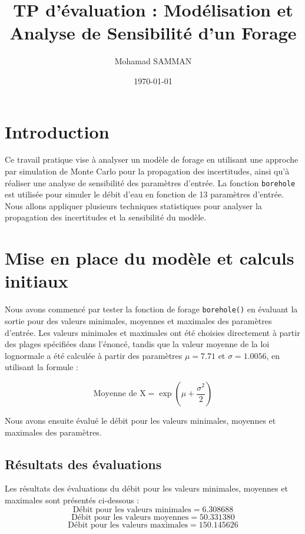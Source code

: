 \documentclass[a4paper,12pt]{article}
\title{TP d'évaluation : Modélisation et Analyse de Sensibilité d'un Forage}
\author{Mohamad SAMMAN}
\date{\today}
\begin{document}
\maketitle
\tableofcontents
\newpage
\section{Introduction}
Ce travail pratique vise à analyser un modèle de forage en utilisant une approche par simulation de Monte Carlo pour la propagation des incertitudes, ainsi qu'à réaliser une analyse de sensibilité des paramètres d'entrée. La fonction \texttt{borehole} est utilisée pour simuler le débit d'eau en fonction de 13 paramètres d'entrée. Nous allons appliquer plusieurs techniques statistiques pour analyser la propagation des incertitudes et la sensibilité du modèle.

\section{Mise en place du modèle et calculs initiaux}

Nous avons commencé par tester la fonction de forage \texttt{borehole()} en évaluant la sortie pour des valeurs minimales, moyennes et maximales des paramètres d'entrée. Les valeurs minimales et maximales ont été choisies directement à partir des plages spécifiées dans l'énoncé, tandis que la valeur moyenne de la loi lognormale a été calculée à partir des paramètres $ \mu = 7.71 $ et $ \sigma = 1.0056 $, en utilisant la formule :

\begin{equation}
\text{Moyenne de X} = \exp\left( \mu + \frac{\sigma^2}{2} \right)
\end{equation}

Nous avons ensuite évalué le débit pour les valeurs minimales, moyennes et maximales des paramètres.

\subsection{Résultats des évaluations}
Les résultats des évaluations du débit pour les valeurs minimales, moyennes et maximales sont présentés ci-dessous :
\begin{equation}
\text{Débit pour les valeurs minimales} = 6.308688 
\end{equation}
\begin{equation}
\text{Débit pour les valeurs moyennes} = 50.331380
\end{equation}
\begin{equation}
\text{Débit pour les valeurs maximales} = 150.145626
\end{equation}
\end{document}
